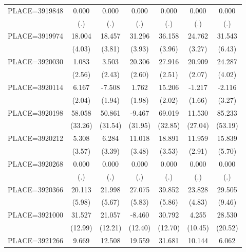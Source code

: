 {\begin{tabular}{l*{6}{c}}
PLACE=3919848       &       0.000&       0.000&       0.000&       0.000&       0.000&       0.000\\
                    &         (.)&         (.)&         (.)&         (.)&         (.)&         (.)\\
PLACE=3919974       &      18.004&      18.457&      31.296&      36.158&      24.762&      31.543\\
                    &      (4.03)&      (3.81)&      (3.93)&      (3.96)&      (3.27)&      (6.43)\\
PLACE=3920030       &       1.083&       3.503&      20.306&      27.916&      20.909&      24.287\\
                    &      (2.56)&      (2.43)&      (2.60)&      (2.51)&      (2.07)&      (4.02)\\
PLACE=3920114       &       6.167&      -7.508&       1.762&      15.206&      -1.217&      -2.116\\
                    &      (2.04)&      (1.94)&      (1.98)&      (2.02)&      (1.66)&      (3.27)\\
PLACE=3920198       &      58.058&      50.861&      -9.467&      69.019&      11.530&      85.233\\
                    &     (33.26)&     (31.54)&     (31.95)&     (32.85)&     (27.04)&     (53.19)\\
PLACE=3920212       &       5.308&       6.284&      11.018&      18.891&      11.959&      15.839\\
                    &      (3.57)&      (3.39)&      (3.48)&      (3.53)&      (2.91)&      (5.70)\\
PLACE=3920268       &       0.000&       0.000&       0.000&       0.000&       0.000&       0.000\\
                    &         (.)&         (.)&         (.)&         (.)&         (.)&         (.)\\
PLACE=3920366       &      20.113&      21.998&      27.075&      39.852&      23.828&      29.505\\
                    &      (5.98)&      (5.67)&      (5.83)&      (5.86)&      (4.83)&      (9.46)\\
PLACE=3921000       &      31.527&      21.057&      -8.460&      30.792&       4.255&      28.530\\
                    &     (12.99)&     (12.21)&     (12.40)&     (12.70)&     (10.45)&     (20.52)\\
PLACE=3921266       &       9.669&      12.508&      19.559&      31.681&      10.144&       6.062\\

\end{tabular}}
